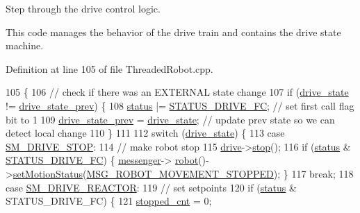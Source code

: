 Step through the drive control logic. 

This code manages the behavior of the drive train and contains the drive state machine. 

Definition at line 105 of file Threaded\+Robot.\+cpp.


\begin{DoxyCode}
105                                         \{
106     \textcolor{comment}{// check if there was an EXTERNAL state change}
107     \textcolor{keywordflow}{if} (\hyperlink{class_threaded_robot_a8cc4fc4f00ff6566604f9499d427698a}{drive\_state} != \hyperlink{class_threaded_robot_a4a4a3eab10c962150bc5194f22d10496}{drive\_state\_prev}) \{
108         \hyperlink{class_threaded_robot_a10f3a9d1b27ca8e7a1ada75323c75879}{status} |= \hyperlink{_threaded_robot_8hpp_a0bd5b2755ddab25dc7c7f0fd9f907e92}{STATUS\_DRIVE\_FC}; \textcolor{comment}{// set first call flag bit to 1}
109         \hyperlink{class_threaded_robot_a4a4a3eab10c962150bc5194f22d10496}{drive\_state\_prev} = \hyperlink{class_threaded_robot_a8cc4fc4f00ff6566604f9499d427698a}{drive\_state}; \textcolor{comment}{// update prev state so we can detect
       local change}
110     \}
111 
112     \textcolor{keywordflow}{switch} (\hyperlink{class_threaded_robot_a8cc4fc4f00ff6566604f9499d427698a}{drive\_state}) \{
113         \textcolor{keywordflow}{case} \hyperlink{_threaded_robot_8hpp_a660f930e51755e1c2e76220fc1952a82}{SM\_DRIVE\_STOP}:
114             \textcolor{comment}{// make robot stop}
115             \hyperlink{class_threaded_robot_ad666af7d773c8096210f6b5c4d060086}{drive}->\hyperlink{class_drive_train_a18d4c7b82118a1da8910d09a31f88a38}{stop}();
116             \textcolor{keywordflow}{if} (\hyperlink{class_threaded_robot_a10f3a9d1b27ca8e7a1ada75323c75879}{status} & \hyperlink{_threaded_robot_8hpp_a0bd5b2755ddab25dc7c7f0fd9f907e92}{STATUS\_DRIVE\_FC}) \{ \hyperlink{class_threaded_robot_a7ff65f6f18c5d3a9d5823e0a00b46c9f}{messenger}->
      \hyperlink{class_messenger_aa07992df20b2aee6d2c4defd8d6b110c}{robot}()->\hyperlink{class_robot_data_a72b1b729501cd7a0620e83c5d4d9a714}{setMotionStatus}(\hyperlink{config_8h_a819fd042d57965904b3cc073fd216d7f}{MSG\_ROBOT\_MOVEMENT\_STOPPED}); \}
117             \textcolor{keywordflow}{break};
118         \textcolor{keywordflow}{case} \hyperlink{_threaded_robot_8hpp_ad8059005f360a46de99b00ca40801fec}{SM\_DRIVE\_REACTOR}:
119             \textcolor{comment}{// set setpoints}
120             \textcolor{keywordflow}{if} (\hyperlink{class_threaded_robot_a10f3a9d1b27ca8e7a1ada75323c75879}{status} & STATUS\_DRIVE\_FC) \{
121                 \hyperlink{class_threaded_robot_a638cd7916d1c1c8a83d15c47a8fe6ef0}{stopped\_cnt} = 0;

\end{DoxyCode}
